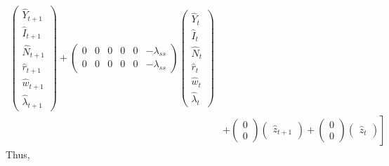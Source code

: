 \documentclass[11pt]{article}
\numberwithin{equation}{section} %
\numberwithin{figure}{section} %
\numberwithin{table}{section} %
\theoremstyle{definition}
\begin{document}
\begin{align*}
\begin{pmatrix}
        \hat{Y}_{t+1} \\
        \hat{I}_{t+1} \\
        \hat{N}_{t+1} \\
        \hat{r}_{t+1} \\
        \hat{w}_{t+1} \\
        \hat{\lambda}_{t+1}
    \end{pmatrix} + \begin{pmatrix}
        0 & 0 & 0 & 0 & 0 & -\lambda_{ss} \\
        0 & 0 & 0 & 0 & 0 & -\lambda_{ss}
    \end{pmatrix} \begin{pmatrix}
        \hat{Y}_t \\
        \hat{I}_t \\
        \hat{N}_t \\
        \hat{r}_t \\
        \hat{w}_t \\
        \hat{\lambda}_t
    \end{pmatrix} \\
    &+ \left.\begin{pmatrix}
        0 \\ 0
    \end{pmatrix} \begin{pmatrix}
        \hat{z}_{t+1}
    \end{pmatrix} + \begin{pmatrix}
        0 \\ 0
    \end{pmatrix} \begin{pmatrix}
        \hat{z}_t
    \end{pmatrix} \right]
\end{align*}
Thus,
\end{document}

